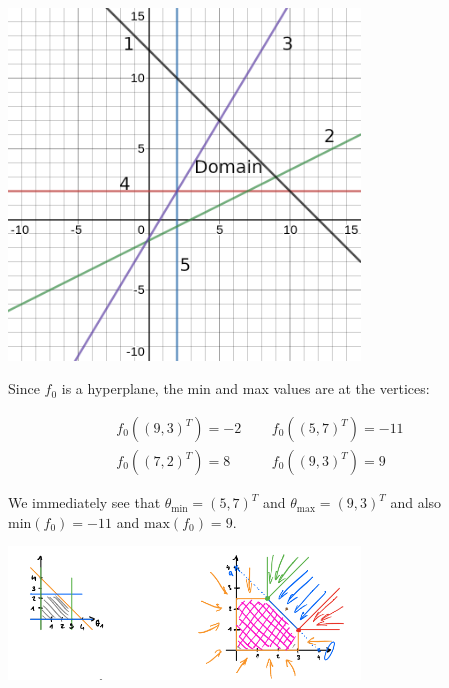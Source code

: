 %
%
%
\begin{flushleft}
\includegraphics[width=0.7\textwidth]{problem1.png}
\end{flushleft}
\begin{flushleft}
Since $f_0$ is a hyperplane, the min and max values are at the vertices:
\end{flushleft}
\begin{align*}
  f_0((9,3)^T) = -2 \;\;\;\;\;& f_0((5,7)^T) = -11 \\ f_0((7,2)^T) = 8 \;\;\;\;\;& f_0((9,3)^T) = 9
\end{align*}
\begin{flushleft}
  We immediately see that $\theta_\text{min} = (5,7)^T$ and $\theta_\text{max} = (9,3)^T$ and also $\mathrm{min}(f_0) = -11$ and $\mathrm{max}(f_0) = 9$.
\end{flushleft}
%
%
\newpage
{}
%
\begin{flushleft}
\includegraphics[width=0.7\textwidth]{problem2.png}
\end{flushleft}
